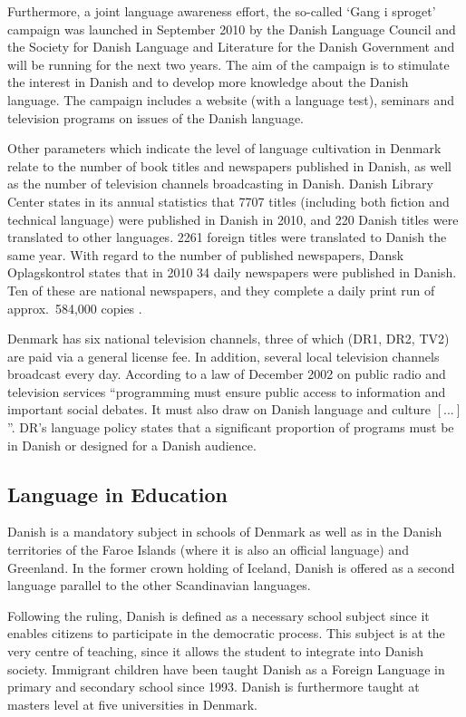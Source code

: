 \begin{multicols}{2}
Furthermore, a joint language awareness effort, the so-called `Gang i sproget' campaign was launched in September 2010 by the Danish Language Council and the Society for Danish Language and Literature for the Danish Government and will be running for the next two years. The aim of the campaign is to stimulate the interest in Danish and to develop more knowledge about the Danish language. The campaign includes a website (with a language test), seminars and television programs on issues of the Danish language. 

Other parameters which indicate the level of language cultivation in Denmark relate to the number of book titles and newspapers published in Danish, as well as the number of television channels broadcasting in Danish. Danish Library Center states in its annual statistics that 7707 titles (including both fiction and technical language) were published in Danish in 2010, and 220 Danish titles were translated to other languages. 2261 foreign titles were translated to Danish the same year. With regard to the number of published newspapers, Dansk Oplagskontrol states that in 2010 34 daily newspapers were published in Danish. Ten of these are national newspapers, and they complete a daily print run of approx.\ 584,000 copies \cite{ddo}. 

Denmark has six national television channels, three of which (DR1, DR2, TV2) are paid via a general license fee. In addition, several local television channels broadcast every day. According to a law of December 2002 on public radio and television services ``programming must ensure public access to information and important social debates. It must also draw on Danish language and culture $[...]$''. DR's language policy states that a significant proportion of programs must be in Danish or designed for a Danish audience. 


\subsection{Language in Education}

Danish is a mandatory subject in schools of Denmark as well as in the Danish territories of the Faroe Islands (where it is also an official language) and Greenland. In the former crown holding of Iceland, Danish is offered as a second language parallel to the other Scandinavian languages.

Following the ruling, Danish is defined as a necessary school subject since it enables citizens to participate in the democratic process. This subject is at the very centre of teaching, since it allows the student to integrate into Danish society. Immigrant children have been taught Danish as a Foreign Language in primary and secondary school since 1993. Danish is furthermore taught at masters level at five universities in Denmark. 


\end{multicols}
